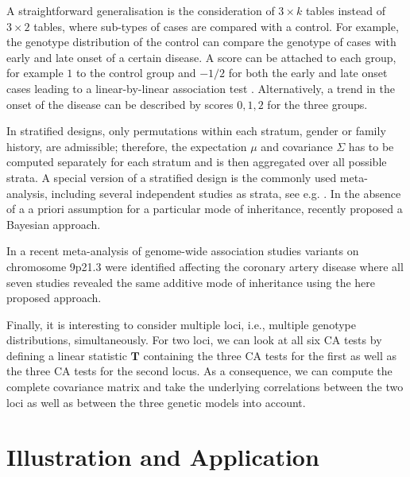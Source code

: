 \documentclass[bimj,fleqn]{w-art}
\newcommand{\T}{\mathbf{T}}
\begin{document}
A straightforward generalisation is the consideration of $3 \times k$ tables 
instead of $3 \times 2$ tables, where sub-types of cases are compared 
with a control. For example, the genotype distribution
of the control can compare the genotype
of cases with early and late onset of a certain disease. 
A score can be attached to each group, for example 
$1$ to the control group and $-1/2$ for both the early and late onset
cases leading to a linear-by-linear association test \citep{bookagresti2002}. Alternatively,
a trend in the onset of the disease can be described by scores $0, 1, 2$
for the three groups.

In stratified designs, only permutations within each stratum, gender or
family history, are 
admissible; therefore, the expectation $\mu$ and covariance $\Sigma$ has
to be computed separately for each stratum and is then aggregated
over all possible strata. A special version of a stratified design is the commonly used 
meta-analysis, 
including several independent studies as strata, see e.g. \citet{Kavvoura2008}. 
In the absence of a a priori assumption for a particular mode of inheritance, recently 
 \citet{Salanti2008} proposed a Bayesian approach.
 
 In a recent meta-analysis of genome-wide association studies variants on chromosome 9p21.3 
 were identified affecting the coronary artery disease \citep{Schunkert2008} 
 where all seven studies revealed the same additive mode of inheritance using the here proposed approach.


Finally, it is interesting to consider multiple loci, i.e., 
multiple genotype distributions, simultaneously. For two loci, 
we can look at all six CA tests by defining a linear statistic
$\T$ containing the three CA tests for the first as well 
as the three CA tests for the second locus. As a consequence,
we can compute the complete covariance matrix and take the 
underlying correlations between the two loci as well as between the three genetic models into account.

\section{Illustration and Application}
\end{document}
